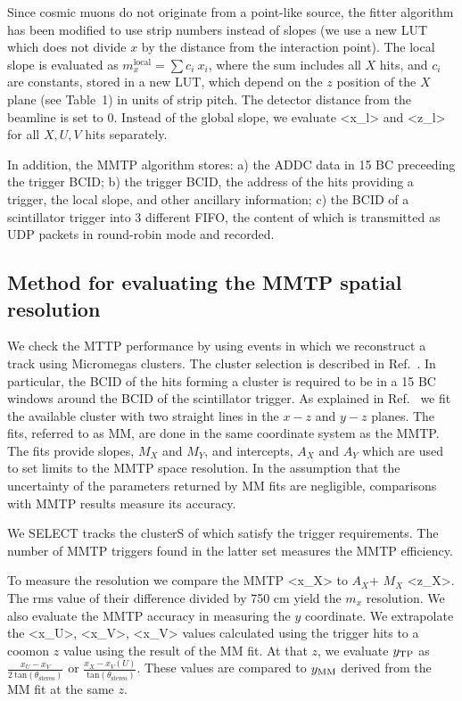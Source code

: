 Since cosmic muons do not originate from a point-like source, the fitter algorithm has been modified to use strip numbers instead of slopes
(we use a new LUT which does not divide $x$ by the distance from the interaction point).
The local slope is evaluated as    $m_x^\text{local} = \sum c_i \ x_i$, where the sum includes all $X$ hits, and $c_i$ are constants,
stored in a new LUT, which depend on the $z$ position of the $X$ plane (see Table~1) in units of strip pitch. 
 The detector distance from the beamline is set to 0.
 Instead of the global slope, we evaluate <x_l> and <z_l> for all  $X,U,V$ hits separately.

 In addition, the MMTP algorithm stores: a) the ADDC data in 15 BC preceeding the trigger BCID; b) the trigger BCID, the address of the hits
 providing a trigger, the local slope, and other ancillary information; c) the BCID of a scintillator trigger into 3 different FIFO,
 the content of which is transmitted as UDP packets
 in round-robin mode and recorded.
 
\subsection{Method for evaluating the MMTP spatial resolution}
\label{sec:alg-resol}

 We check the MTTP performance by using events in which we reconstruct a track using Micromegas clusters.
 The cluster selection is described in Ref.~\cite{noise}. In particular, the  BCID of the hits forming a cluster is required
 to be in a 15 BC windows around the BCID of the scintillator trigger.
 As explained in Ref.~\cite{noisy} we fit the available cluster with two straight lines in the $x-z$ and $y-z$ planes.
 The fits, referred to as MM, are done in the same coordinate system as the MMTP. The fits provide slopes, $M_X$ and $M_Y$, and intercepts, $A_X$ and $A_Y$
 which are used to set limits to the MMTP space resolution. In the assumption that the uncertainty of the parameters returned by MM fits 
  are negligible,  comparisons with MMTP results measure its accuracy.

  We SELECT tracks the clusterS of which satisfy the trigger requirements. The number of MMTP triggers found in the latter
 set measures the MMTP efficiency.

 To measure the resolution we compare the MMTP <x_X>  to  $A_X$+ $M_X$ <z_X>. The rms value of their difference divided by 750 cm
 yield the $m_x$ resolution.
 We also evaluate the MMTP accuracy in measuring the $y$ coordinate. We extrapolate the  <x_U>, <x_V>, <x_V> values calculated
 using the trigger hits to a coomon $z$ value using the result of the MM fit. At that $z$, we evaluate $y_{\rm TP}$
 as   $\frac{x_U - x_V}{2\ \text{tan}(\theta_\text{stereo})}$ or  $\frac{x_X - x_V(U)}{\ \text{tan}(\theta_\text{stereo})}$.
 These values are compared to  $y_{\rm MM}$ derived from the MM fit at the same $z$.
 

